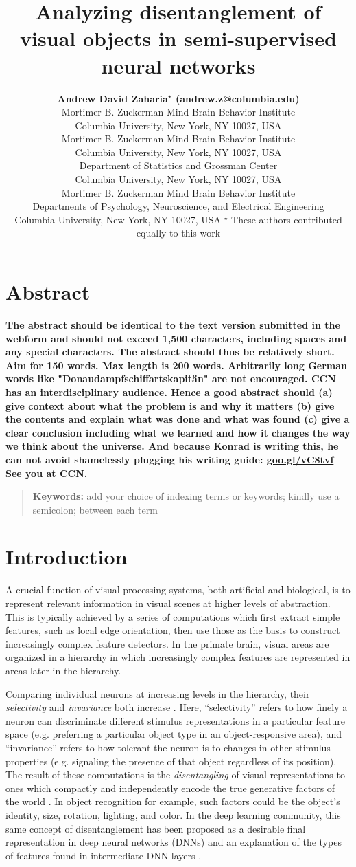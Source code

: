 \documentclass[10pt,letterpaper]{article}
\title{Analyzing disentanglement of visual objects in semi-supervised neural networks}
\author{{\large \bf Andrew David Zaharia$^\star$ (andrew.z@columbia.edu)} \\
  Mortimer B. Zuckerman Mind Brain Behavior Institute\\
  Columbia University, New York, NY 10027, USA
  \AND {\large \bf Benjamin Peters$^\star$ (benjamin.peters@columbia.edu)} \\
  Mortimer B. Zuckerman Mind Brain Behavior Institute\\
  Columbia University, New York, NY 10027, USA
  \AND {\large \bf John Cunningham (jpc2181@columbia.edu)} \\
  Department of Statistics and Grossman Center\\
  Columbia University, New York, NY 10027, USA
  \AND {\large \bf Nikolaus Kriegeskorte (n.kriegeskorte@columbia.edu)} \\
  Mortimer B. Zuckerman Mind Brain Behavior Institute\\ Departments of Psychology, Neuroscience, and Electrical Engineering\\
  Columbia University, New York, NY 10027, USA
  \AND $^\star$ These authors contributed equally to this work}
\begin{document}
\maketitle

\section{Abstract}
{
\bf
The abstract should be identical to the text version submitted in the webform and should not exceed 1,500 characters, including spaces and any special characters. The abstract should thus be relatively short. Aim for 150 words.
Max length is 200 words. Arbitrarily long German words like "Donaudampfschiffartskapit\"an" are not encouraged.
CCN has an interdisciplinary audience. Hence a good abstract should
(a) give context about what the problem is and why it matters 
(b) give the contents and explain what was done and what was found
(c) give a clear conclusion including what we learned and how it changes 
the way we think about the universe.
And because Konrad is writing this, he can not avoid shamelessly plugging
his writing guide:
\url{goo.gl/vC8tvf} See you at CCN.
}
\begin{quote}
\small
\textbf{Keywords:} 
add your choice of indexing terms or keywords; kindly use a
semicolon; between each term
\end{quote}


\section{Introduction}

A crucial function of visual processing systems, both artificial and biological, is to represent relevant information in visual scenes at higher levels of abstraction. This is typically achieved by a series of computations which first extract simple features, such as local edge orientation, then use those as the basis to construct increasingly complex feature detectors. In the primate brain, visual areas are organized in a hierarchy in which increasingly complex features are represented in areas later in the hierarchy.

Comparing individual neurons at increasing levels in the hierarchy, their \textit{selectivity} and \textit{invariance} both increase \cite{Rust2010}. Here, ``selectivity'' refers to how finely a neuron can discriminate different stimulus representations in a particular feature space (e.g. preferring a particular object type in an object-responsive area), and ``invariance'' refers to how tolerant the neuron is to changes in other stimulus properties (e.g. signaling the presence of that object regardless of its position). The result of these computations is the \textit{disentangling} of visual representations to ones which compactly and independently encode the true generative factors of the world \cite{DiCarlo2007}. In object recognition for example, such factors could be the object's identity, size, rotation, lighting, and color. In the deep learning community, this same concept of disentanglement has been proposed as a desirable final representation in deep neural networks (DNNs) and an explanation of the types of features found in intermediate DNN layers \cite{Bengio2009}.
\end{document}
